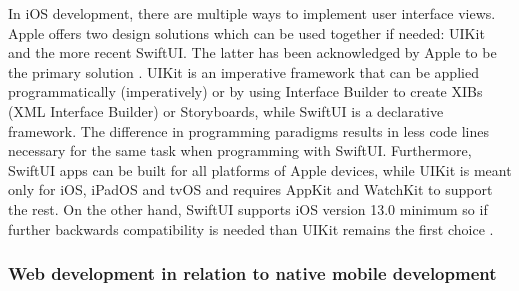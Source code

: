 In iOS development, there are multiple ways to implement user interface views. Apple offers two design solutions which can be used together if needed: UIKit and the more recent SwiftUI. The latter has been acknowledged by Apple to be the primary solution \cite{comparison_technologies_multiplatform}. UIKit is an imperative framework that can be applied programmatically (imperatively) or by using Interface Builder to create XIBs (XML Interface Builder) or Storyboards, while SwiftUI is a declarative framework. The difference in programming paradigms results in less code lines necessary for the same task when programming with SwiftUI. Furthermore, SwiftUI apps can be built for all platforms of Apple devices, while UIKit is meant only for iOS, iPadOS and tvOS and requires AppKit and WatchKit to support the rest. On the other hand, SwiftUI supports iOS version 13.0 minimum so if further backwards compatibility is needed than UIKit remains the first choice \cite{swiftui_overview}\cite{xib_why_use}\cite{swiftui_uikit}.


\subsubsection{Web development in relation to native mobile development}
